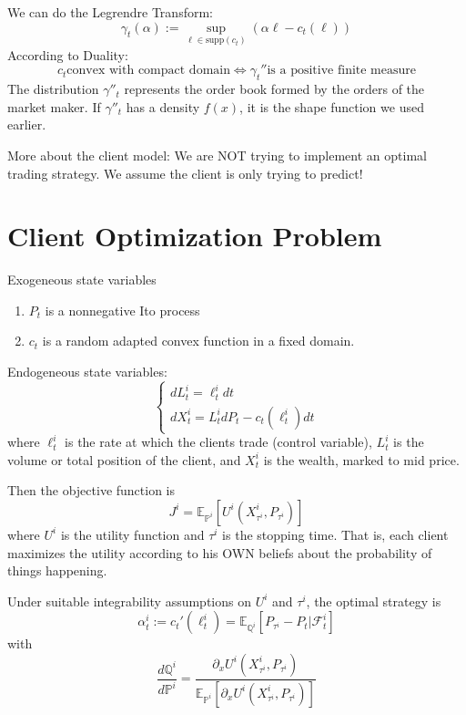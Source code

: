 We can do the Legrendre Transform:
\begin{equation}
	\gamma_t(\alpha) := \sup_{\ell \in \mathrm{supp}(c_t)} \left( \alpha \ell - c_t(\ell) \right)
\end{equation}
According to Duality:
\begin{equation}
	c_t \text{convex with compact domain} \iff \gamma_t'' \text{is a positive finite measure}
\end{equation}
The distribution $\gamma''_t$ represents the order book formed by the orders of the market maker. If $\gamma''_t$ has a density $f(x)$, it is the shape function we used earlier.

More about the client model: We are NOT trying to implement an optimal trading strategy. We assume the client is only trying to predict!

\section{Client Optimization Problem}
Exogeneous state variables
\begin{enumerate}
	\item $P_t$ is a nonnegative Ito process
	\item $c_t$ is a random adapted convex function in a fixed domain.
\end{enumerate}

Endogeneous state variables:
\begin{equation}
	\begin{cases}
		dL_t^i = \ell_t^i dt\\
		dX_t^i = L_t^i dP_t - c_t(\ell_t^i) dt
	\end{cases}
\end{equation}
where $\ell_t^i$ is the rate at which the clients trade (control variable), $L_t^i$ is the volume or total position of the client, and $X_t^i$ is the wealth, marked to mid price. 

Then the objective function is
\begin{equation}
	J^i = \mathbb{E}_{\mathbb{P}^i} \left[ U^i(X_{\tau^i}^i, P_{\tau^i})\right]
\end{equation}
where $U^i$ is the utility function and $\tau^i$ is the stopping time. That is, each client maximizes the utility according to his OWN beliefs about the probability of things happening.

\begin{theorem}\label{thm:opt_trading_strat}
	Under suitable integrability assumptions on $U^i$ and $\tau^i$, the optimal strategy is
	\begin{equation}
		\alpha_t^i := c_t'(\ell_t^i) = \mathbb{E}_{\mathbb{Q}^i} \left[ P_{\tau^i} - P_t | \mathcal{F}^i_t \right]
	\end{equation}
	with
	\begin{equation}
		\frac{d \mathbb{Q}^i}{d \mathbb{P}^i } 
		= 
		\frac{
			\partial_x U^i(X_{\tau^i}^i, P_{\tau^i})
		}{
			\mathbb{E}_{\mathbb{P}^i} \left[ \partial_x U^i(X^i_{\tau^i}, P_{\tau^i}) \right]
		}
	\end{equation}
\end{theorem}

